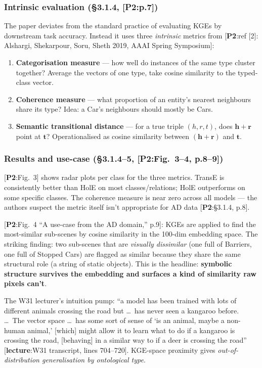 \documentclass[11pt, a4paper]{article}
\newcommand{\paperref}[1]{\textcolor{srcBd}{\small[\textbf{P2}:#1]}}
\newcommand{\lectref}[1]{\textcolor{srcBd}{\small[\textbf{lecture}:#1]}}
\begin{document}
\subsubsection*{Intrinsic evaluation (§3.1.4, \paperref{p.7})}
The paper deviates from the standard practice of evaluating KGEs by downstream task accuracy. Instead it uses three \emph{intrinsic} metrics from \paperref{ref [2]: Alshargi, Shekarpour, Soru, Sheth 2019, AAAI Spring Symposium}:

\begin{enumerate}
  \item \textbf{Categorisation measure} — how well do instances of the same type cluster together? Average the vectors of one type, take cosine similarity to the typed-class vector.
  \item \textbf{Coherence measure} — what proportion of an entity's nearest neighbours share its type? Idea: a Car's neighbours should mostly be Cars.
  \item \textbf{Semantic transitional distance} — for a true triple \((h, r, t)\), does \(\mathbf{h} + \mathbf{r}\) point at \(\mathbf{t}\)? Operationalised as cosine similarity between \((\mathbf{h} + \mathbf{r})\) and \(\mathbf{t}\).
\end{enumerate}

\subsubsection*{Results and use-case (§3.1.4--5, \paperref{Fig.\ 3--4, p.8--9})}
\paperref{Fig.\ 3} shows radar plots per class for the three metrics. TransE is consistently better than HolE on most classes/relations; HolE outperforms on some specific classes. The coherence measure is near zero across all models — the authors suspect the metric itself isn't appropriate for AD data \paperref{§3.1.4, p.8}.

\paperref{Fig.\ 4 ``A use-case from the AD domain,'' p.9}: KGEs are applied to find the most-similar sub-scenes by cosine similarity in the 100-dim embedding space. The striking finding: two sub-scenes that are \emph{visually dissimilar} (one full of Barriers, one full of Stopped Cars) are flagged as similar because they share the same structural role (a string of static objects). This is the headline: \textbf{symbolic structure survives the embedding and surfaces a kind of similarity raw pixels can't}.

\begin{notebox}
The W31 lecturer's intuition pump: ``a model has been trained with lots of different animals crossing the road but \ldots\ has never seen a kangaroo before. \ldots\ The vector space \ldots\ has some sort of sense of `is an animal, maybe a non-human animal,' [which] might allow it to learn what to do if a kangaroo is crossing the road, [behaving] in a similar way to if a deer is crossing the road'' \lectref{W31 transcript, lines 704--720}. KGE-space proximity gives \emph{out-of-distribution generalisation by ontological type}.
\end{notebox}
\end{document}
